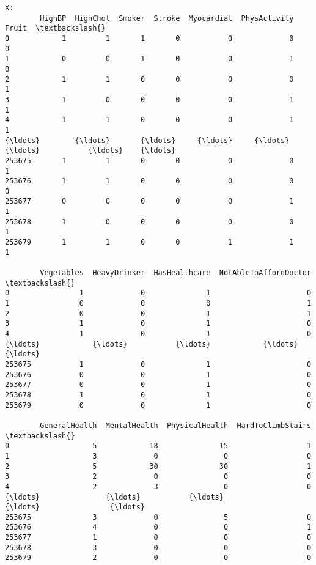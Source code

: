 \documentclass[11pt]{article}
\begin{document}
    \begin{Verbatim}[commandchars=\\\{\}]
X:
        HighBP  HighChol  Smoker  Stroke  Myocardial  PhysActivity  Fruit  \textbackslash{}
0            1         1       1       0           0             0      0
1            0         0       1       0           0             1      0
2            1         1       0       0           0             0      1
3            1         0       0       0           0             1      1
4            1         1       0       0           0             1      1
{\ldots}        {\ldots}       {\ldots}     {\ldots}     {\ldots}         {\ldots}           {\ldots}    {\ldots}
253675       1         1       0       0           0             0      1
253676       1         1       0       0           0             0      0
253677       0         0       0       0           0             1      1
253678       1         0       0       0           0             0      1
253679       1         1       0       0           1             1      1

        Vegetables  HeavyDrinker  HasHealthcare  NotAbleToAffordDoctor  \textbackslash{}
0                1             0              1                      0
1                0             0              0                      1
2                0             0              1                      1
3                1             0              1                      0
4                1             0              1                      0
{\ldots}            {\ldots}           {\ldots}            {\ldots}                    {\ldots}
253675           1             0              1                      0
253676           0             0              1                      0
253677           0             0              1                      0
253678           1             0              1                      0
253679           0             0              1                      0

        GeneralHealth  MentalHealth  PhysicalHealth  HardToClimbStairs  \textbackslash{}
0                   5            18              15                  1
1                   3             0               0                  0
2                   5            30              30                  1
3                   2             0               0                  0
4                   2             3               0                  0
{\ldots}               {\ldots}           {\ldots}             {\ldots}                {\ldots}
253675              3             0               5                  0
253676              4             0               0                  1
253677              1             0               0                  0
253678              3             0               0                  0
253679              2             0               0                  0


\end{Verbatim}
\end{document}
